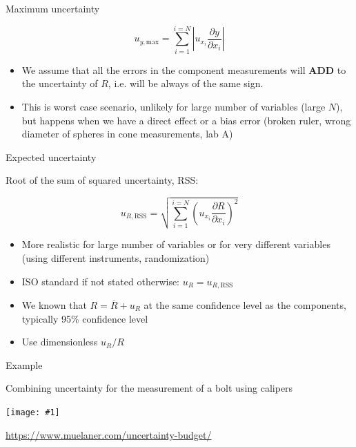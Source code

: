 \documentclass[12pt]{beamer}
\newcommand{\fig}[1]{\centering\texttt{[image: \#1]}}
\begin{document}
%
\begin{frame}{Maximum uncertainty}

\[
u_{y,\mathrm{max}}=\sum_{i=1}^{i=N}\left|u_{x_{i}}\frac{\partial y}{\partial x_{i}}\right|
\]
\begin{itemize}
\item We assume that all the errors in the component measurements will \textbf{ADD}
to the uncertainty of $R$, i.e. will be always of the same sign. 
\item This is worst case scenario, unlikely for large number of variables
(large $N$), but happens when we have a direct effect or a bias error
(broken ruler, wrong diameter of spheres in cone measurements, lab
A)
\end{itemize}
\end{frame}

\begin{frame}{Expected uncertainty}

Root of the sum of squared uncertainty, RSS:

\[
u_{R,\mathrm{RSS}}=\sqrt{\sum_{i=1}^{i=N}\left(u_{x_{i}}\frac{\partial R}{\partial x_{i}}\right)^{2}}
\]
\begin{itemize}
\item More realistic for large number of variables or for very different
variables (using different instruments, randomization)

\item ISO standard if not stated otherwise:  $ u_{R}=u_{R,\textrm{RSS}}$ 

\item We known that $R=\overline{R}+u_{R}$ at the same confidence level
as the components, typically 95\% confidence level

\item Use dimensionless $u_{R}/R$
\end{itemize}
\end{frame}


\begin{frame}{Example}

Combining uncertainty for the measurement of a bolt using calipers


\fig{calipers_bolt}

\small{\url{https://www.muelaner.com/uncertainty-budget/}}
\end{frame}
\end{document}
